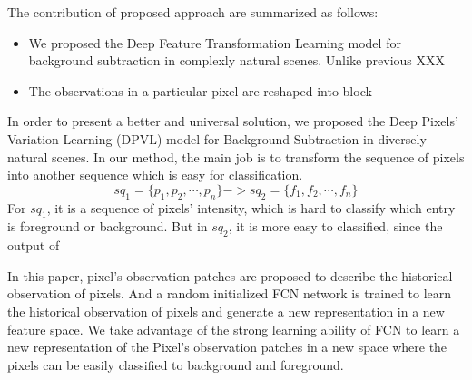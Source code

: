 \documentclass[journal]{IEEEtran}
\begin{document}









The contribution of proposed approach are summarized as follows:
\begin{itemize}
    \item We proposed the Deep Feature Transformation Learning model for background subtraction in complexly natural scenes.
        Unlike previous XXX

    \item The observations in a particular pixel are reshaped into block 
\end{itemize}

In order to present a better and universal solution, we proposed the Deep Pixels’ Variation Learning (DPVL) model for Background Subtraction in diversely natural scenes.
In our method, the main job is to transform the sequence of pixels into another sequence which is easy for classification.
\begin{equation}
    sq_1 = \{p_1,p_2,\cdots, p_n\} -> sq_2 = \{f_1, f_2, \cdots, f_n\}
\end{equation}
For $sq_1$, it is a sequence of pixels' intensity, which is hard to classify which entry is foreground or background.
%
But in $sq_2$, it is more easy to classified, since the output of

In this paper, pixel’s observation patches are proposed to describe the historical observation of pixels.
And a random initialized FCN network is trained to learn the historical observation of pixels and generate a new representation in a new feature space.
We take advantage of the strong learning ability of FCN to learn a new representation of the Pixel’s observation patches in a new space where the pixels can be easily classified to background and foreground.
\end{document}
